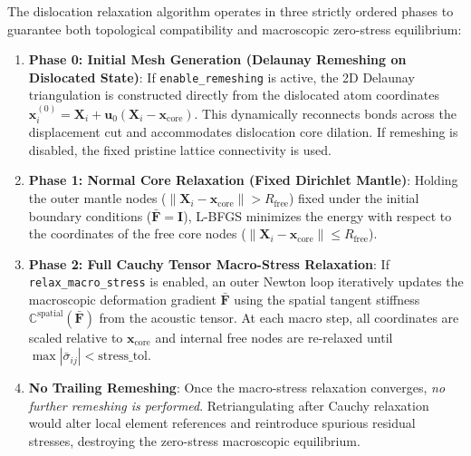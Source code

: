 \documentclass[11pt,a4paper]{article}
\begin{document}
The dislocation relaxation algorithm operates in three strictly ordered phases to guarantee both topological compatibility and macroscopic zero-stress equilibrium:
\begin{enumerate}
    \item \textbf{Phase 0: Initial Mesh Generation (Delaunay Remeshing on Dislocated State)}:
    If \texttt{enable\_remeshing} is active, the 2D Delaunay triangulation is constructed directly from the dislocated atom coordinates $\mathbf{x}_i^{(0)} = \mathbf{X}_i + \mathbf{u}_0(\mathbf{X}_i - \mathbf{x}_{\text{core}})$. This dynamically reconnects bonds across the displacement cut and accommodates dislocation core dilation. If remeshing is disabled, the fixed pristine lattice connectivity is used.
    \item \textbf{Phase 1: Normal Core Relaxation (Fixed Dirichlet Mantle)}:
    Holding the outer mantle nodes ($\|\mathbf{X}_i - \mathbf{x}_{\text{core}}\| > R_{\text{free}}$) fixed under the initial boundary conditions ($\bar{\mathbf{F}} = \mathbf{I}$), L-BFGS minimizes the energy with respect to the coordinates of the free core nodes ($\|\mathbf{X}_i - \mathbf{x}_{\text{core}}\| \le R_{\text{free}}$).
    \item \textbf{Phase 2: Full Cauchy Tensor Macro-Stress Relaxation}:
    If \texttt{relax\_macro\_stress} is enabled, an outer Newton loop iteratively updates the macroscopic deformation gradient $\bar{\mathbf{F}}$ using the spatial tangent stiffness $\mathbb{C}^{\text{spatial}}(\bar{\mathbf{F}})$ from the acoustic tensor. At each macro step, all coordinates are scaled relative to $\mathbf{x}_{\text{core}}$ and internal free nodes are re-relaxed until $\max|\bar{\sigma}_{ij}| < \text{stress\_tol}$.
    \item \textbf{No Trailing Remeshing}:
    Once the macro-stress relaxation converges, \emph{no further remeshing is performed}. Retriangulating after Cauchy relaxation would alter local element references and reintroduce spurious residual stresses, destroying the zero-stress macroscopic equilibrium.
\end{enumerate}
\end{document}
